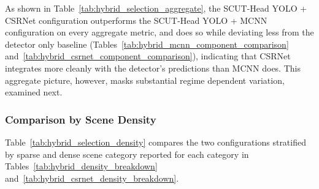As shown in Table~\ref{tab:hybrid_selection_aggregate}, the SCUT-Head YOLO + CSRNet configuration outperforms the SCUT-Head YOLO + MCNN configuration on every aggregate metric, and does so while deviating less from the detector only baseline (Tables~\ref{tab:hybrid_mcnn_component_comparison} and~\ref{tab:hybrid_csrnet_component_comparison}), indicating that CSRNet integrates more cleanly with the detector's predictions than MCNN does. This aggregate picture, however, masks substantial regime dependent variation, examined next.

\subsubsection{Comparison by Scene Density}

Table~\ref{tab:hybrid_selection_density} compares the two configurations stratified by sparse and dense scene category reported for each category in Tables~\ref{tab:hybrid_density_breakdown} and~\ref{tab:hybrid_csrnet_density_breakdown}.

